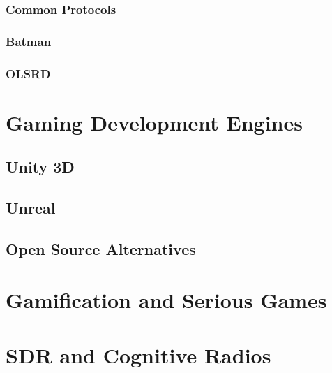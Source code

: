 \subsubsection{Common Protocols}

\subsubsection{Batman}

\subsubsection{OLSRD}


\section{Gaming Development Engines}

\subsection{Unity 3D}

\subsection{Unreal}

\subsection{Open Source Alternatives}


\section{Gamification and Serious Games}


\section{SDR and Cognitive Radios}


